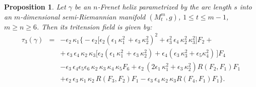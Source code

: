 \documentclass[11pt]{amsart}
\theoremstyle{plain}
\newtheorem{proposition}  [theorem]  {Proposition}
\theoremstyle{definition}
\numberwithin{equation}{section}
\begin{document}
\begin{proposition}\label{prop-n-Frenet-tri}
Let $\gamma$ be an $n$-Frenet helix parametrized by the arc length $s$ into an $m$-dimensional semi-Riemannian manifold $(M_t^m, g)$, $1 \leq t \leq m-1$, $m \geq n\geq 6$. Then its tritension field is given by:
\begin{eqnarray*}
\tau_3(\gamma) & = & - \epsilon_2 \, \kappa_1 \big\{ - \epsilon_2 \big[ \epsilon_2 (\epsilon_1\, \kappa_1^2 \,  + \epsilon_3 \, \kappa_2^2)^2  + \epsilon_3^2 \, \epsilon_4  \, \kappa_2^2 \, \kappa_3^2 \big] F_2 +\\
&&+ \, \epsilon_3 \, \epsilon_4 \,  \kappa_2 \, \kappa_3 \big[\epsilon_2 (\epsilon_1\, \kappa_1^2 \,  + \epsilon_3 \, \kappa_2^2 )+ \epsilon_4(\epsilon_3 \,  \kappa_3^2 + \epsilon_5 \kappa_4^2 )\, \big] F_4 \\
&& -\epsilon_3 \, \epsilon_4 \epsilon_5 \epsilon_6 \,\kappa_2 \, \kappa_3 \, \kappa_4 \, \kappa_5 F_6 +  \epsilon_2 \, (2 \epsilon_1\, \kappa_1^2  + \epsilon_3 \, \kappa_2^2 ) R( F_2, F_1) F_1 \\
&&+ \epsilon_2 \, \epsilon_3 \, \kappa_1 \,  \kappa_2 \, R( F_3 , F_2) F_1 - \epsilon_3 \, \epsilon_4 \,\kappa_2 \, \kappa_3 R(F_4, F_1) F_1 \big\}.
\end{eqnarray*}
\end{proposition}
\end{document}
